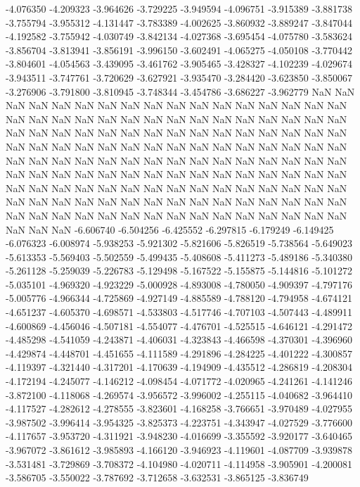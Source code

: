 -4.076350
-4.209323
-3.964626
-3.729225
-3.949594
-4.096751
-3.915389
-3.881738
-3.755794
-3.955312
-4.131447
-3.783389
-4.002625
-3.860932
-3.889247
-3.847044
-4.192582
-3.755942
-4.030749
-3.842134
-4.027368
-3.695454
-4.075780
-3.583624
-3.856704
-3.813941
-3.856191
-3.996150
-3.602491
-4.065275
-4.050108
-3.770442
-3.804601
-4.054563
-3.439095
-3.461762
-3.905465
-3.428327
-4.102239
-4.029674
-3.943511
-3.747761
-3.720629
-3.627921
-3.935470
-3.284420
-3.623850
-3.850067
-3.276906
-3.791800
-3.810945
-3.748344
-3.454786
-3.686227
-3.962779
NaN
NaN
NaN
NaN
NaN
NaN
NaN
NaN
NaN
NaN
NaN
NaN
NaN
NaN
NaN
NaN
NaN
NaN
NaN
NaN
NaN
NaN
NaN
NaN
NaN
NaN
NaN
NaN
NaN
NaN
NaN
NaN
NaN
NaN
NaN
NaN
NaN
NaN
NaN
NaN
NaN
NaN
NaN
NaN
NaN
NaN
NaN
NaN
NaN
NaN
NaN
NaN
NaN
NaN
NaN
NaN
NaN
NaN
NaN
NaN
NaN
NaN
NaN
NaN
NaN
NaN
NaN
NaN
NaN
NaN
NaN
NaN
NaN
NaN
NaN
NaN
NaN
NaN
NaN
NaN
NaN
NaN
NaN
NaN
NaN
NaN
NaN
NaN
NaN
NaN
NaN
NaN
NaN
NaN
NaN
NaN
NaN
NaN
NaN
NaN
NaN
NaN
NaN
NaN
NaN
NaN
NaN
NaN
NaN
NaN
NaN
NaN
NaN
NaN
NaN
NaN
NaN
NaN
NaN
NaN
NaN
NaN
NaN
NaN
NaN
NaN
NaN
NaN
NaN
NaN
NaN
NaN
NaN
NaN
NaN
NaN
NaN
NaN
NaN
NaN
-6.606740
-6.504256
-6.425552
-6.297815
-6.179249
-6.149425
-6.076323
-6.008974
-5.938253
-5.921302
-5.821606
-5.826519
-5.738564
-5.649023
-5.613353
-5.569403
-5.502559
-5.499435
-5.408608
-5.411273
-5.489186
-5.340380
-5.261128
-5.259039
-5.226783
-5.129498
-5.167522
-5.155875
-5.144816
-5.101272
-5.035101
-4.969320
-4.923229
-5.000928
-4.893008
-4.780050
-4.909397
-4.797176
-5.005776
-4.966344
-4.725869
-4.927149
-4.885589
-4.788120
-4.794958
-4.674121
-4.651237
-4.605370
-4.698571
-4.533803
-4.517746
-4.707103
-4.507443
-4.489911
-4.600869
-4.456046
-4.507181
-4.554077
-4.476701
-4.525515
-4.646121
-4.291472
-4.485298
-4.541059
-4.243871
-4.406031
-4.323843
-4.466598
-4.370301
-4.396960
-4.429874
-4.448701
-4.451655
-4.111589
-4.291896
-4.284225
-4.401222
-4.300857
-4.119397
-4.321440
-4.317201
-4.170639
-4.194909
-4.435512
-4.286819
-4.208304
-4.172194
-4.245077
-4.146212
-4.098454
-4.071772
-4.020965
-4.241261
-4.141246
-3.872100
-4.118068
-4.269574
-3.956572
-3.996002
-4.255115
-4.040682
-3.964410
-4.117527
-4.282612
-4.278555
-3.823601
-4.168258
-3.766651
-3.970489
-4.027955
-3.987502
-3.996414
-3.954325
-3.825373
-4.223751
-4.343947
-4.027529
-3.776600
-4.117657
-3.953720
-4.311921
-3.948230
-4.016699
-3.355592
-3.920177
-3.640465
-3.967072
-3.861612
-3.985893
-4.166120
-3.946923
-4.119601
-4.087709
-3.939878
-3.531481
-3.729869
-3.708372
-4.104980
-4.020711
-4.114958
-3.905901
-4.200081
-3.586705
-3.550022
-3.787692
-3.712658
-3.632531
-3.865125
-3.836749
